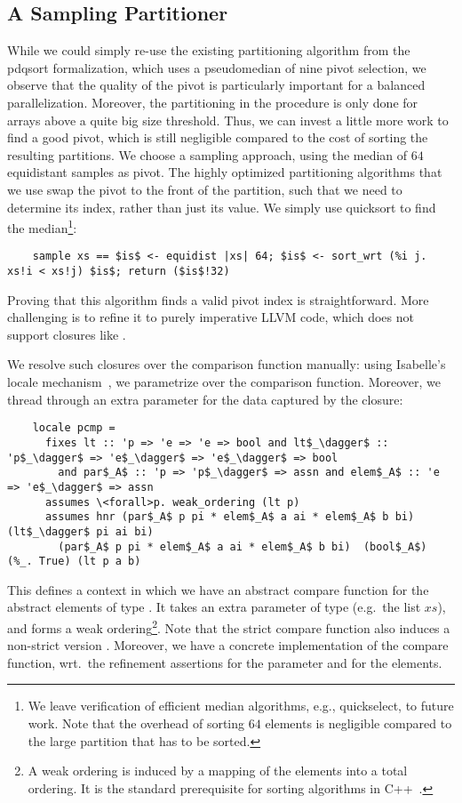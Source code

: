 \documentclass[a4paper,UKenglish,cleveref, autoref, thm-restate]{lipics-v2021}
\begin{document}
  \subsection{A Sampling Partitioner}
  While we could simply re-use the existing partitioning algorithm from the pdqsort formalization,
  which uses a pseudomedian of nine pivot selection, we observe that the quality of the pivot is
  particularly important for a balanced parallelization. Moreover, the partitioning in the  procedure
  is only done for arrays above a quite big size threshold. Thus, we can invest a little more work to find
  a good pivot, which is still negligible compared to the cost of sorting the resulting partitions.
  We choose a sampling approach, using the median of $64$ equidistant samples as pivot.
  The highly optimized partitioning algorithms that we use swap the pivot to the front of the partition,
  such that we need to determine its index, rather than just its value. We simply use quicksort to find the median\footnote{
  We leave verification of efficient median algorithms, e.g., quickselect, to future work. Note that the overhead of sorting $64$ elements is negligible compared to the large partition that has to be sorted.}:
  \begin{lstlisting}
    sample xs == $is$ <- equidist |xs| 64; $is$ <- sort_wrt (%i j. xs!i < xs!j) $is$; return ($is$!32)
  \end{lstlisting}
  Proving that this algorithm finds a valid pivot index is straightforward. More challenging is to refine it to
  purely imperative LLVM code, which does not support closures like .

  We resolve such closures over the comparison function manually: using Isabelle's locale mechanism~\cite{KWP99},
  we parametrize over the comparison function. Moreover, we thread through an extra parameter for the data
  captured by the closure:
  \begin{lstlisting}
    locale pcmp =
      fixes lt :: 'p => 'e => 'e => bool and lt$_\dagger$ :: 'p$_\dagger$ => 'e$_\dagger$ => 'e$_\dagger$ => bool
        and par$_A$ :: 'p => 'p$_\dagger$ => assn and elem$_A$ :: 'e => 'e$_\dagger$ => assn
      assumes \<forall>p. weak_ordering (lt p)
      assumes hnr (par$_A$ p pi * elem$_A$ a ai * elem$_A$ b bi) (lt$_\dagger$ pi ai bi)
        (par$_A$ p pi * elem$_A$ a ai * elem$_A$ b bi)  (bool$_A$)  (%_. True) (lt p a b)
  \end{lstlisting}
  This defines a context in which we have an abstract compare function  for the abstract elements of type .
  It takes an extra parameter of type  (e.g.\ the list $xs$), and forms a weak ordering\footnote{
    A weak ordering is induced by a mapping of the elements into a total ordering. It is the standard prerequisite for sorting algorithms in C++~\cite{Josu12}.
  }. Note that the strict compare function  also induces a non-strict version .
  Moreover, we have a concrete implementation  of the compare function, wrt.\ the refinement assertions
   for the parameter and  for the elements.
\end{document}
